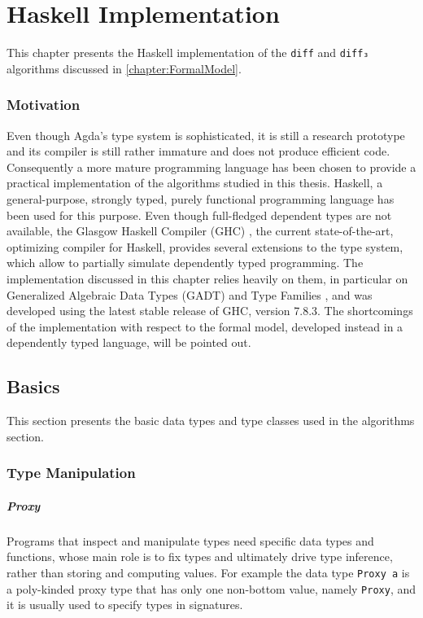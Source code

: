 \documentclass[../Thesis.tex]{subfiles}
\begin{document}
\chapter{Haskell Implementation}
\label{chp:Haskell}
This chapter presents the Haskell implementation of the \texttt{diff}
and \texttt{diff₃} algorithms discussed in \ref{chapter:FormalModel}.

	\subsection*{Motivation}
	Even though Agda's type system is sophisticated, it is still a research 
	prototype and its compiler is still rather immature and does not produce
	efficient code. Consequently a more mature programming language has 
	been chosen to provide a practical implementation of
	the algorithms studied in this thesis.
	Haskell, a general-purpose, strongly typed, purely functional 
	programming language \cite{Hudak07ahistory, Marlow_haskell2010} 
	has been used for this purpose.
	Even though full-fledged dependent types are not available, the 
	Glasgow Haskell Compiler (GHC) \cite{GHC}, the current state-of-the-art, 
	optimizing compiler for Haskell, provides several extensions to the type
	system, which allow to partially simulate dependently typed programming.
	The implementation discussed in this chapter 
	relies heavily on them, in particular on Generalized Algebraic Data Types 
	(GADT) \cite{JonWasWei04,PeytonJonesSUT,SchGADT} and Type Families
	\cite{ChakATC,ChakATS,SchrTCO,SchrTOT,Kiselyov09funwith}, and was
	developed using the latest stable release of GHC, version 7.8.3.
	The shortcomings of the implementation with respect
	to the formal model, developed instead in a dependently typed language, 
	will be pointed out.
	
	\section{Basics}
	This section presents the basic data types and type classes used 
	in the algorithms section.

	\subsection{Type Manipulation}

	\paragraph{Proxy}
	Programs that inspect and manipulate types need specific data types
	and functions, whose main role is to fix types and 
	ultimately drive type inference, rather than storing and computing values.
	For example the data type \texttt{Proxy a} is a poly-kinded proxy type that 
	has only one non-bottom value, namely \texttt{Proxy}, and it
	is usually used to specify types in signatures.
	
\end{document}
